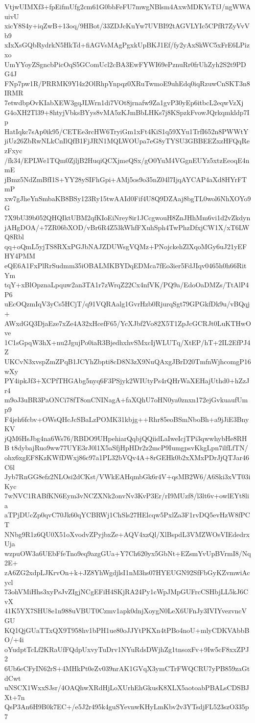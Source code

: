 VtjwUIMXf3+fpEifmUfg2cm61G0bbFeFU7mwgNBlsm4AxwMDKYsTfJ/ngWWAuivU
xicY8S4y+iqZwB+13oq/9HBot/33ZDJcKuYw7UVBI92tAGVLYIc5CPfR7ZyVvVb9
xIxXsGQbRydrkN5HkTd+fiAGVsMAgPgxkUpBKJ1Ef/fy2yAxSkWC5xFrE6LPizxo
UmYYoyZSgncbPicOqS5GComUcl2cBA3EwFYWI69ePznuRr0frUhZyh2S2t9PDG4J
FNp7pw1R/PRRMK9Yl4z2OlRhpYnpqz0XRuTwmoE9uhEdq0iqRzuwCnSKT3n8IRMR
7etwdbpOvKIabXEW3gqJLWrn1di7VOt8jrnafw9Za1gvP30yEp6itbcL2eqwVzXj
G4oXH2Tl39+8htyjVbksBYys8vMA5zKJmBbLHKs7j8KSpzkFvowJQrkqmkldp7Ip
HatIqkc7sAp0ik95/CETEe3rcHW6TryiGm1xFt4KiS1q59XYu1TrfI652n8PWWtY
jiUz26ZbRwNLkCnIlQfB1FjJRN1MQLWOUpa7eG8yTYSU3GBBEEZxzHFQqRezFxyc
/fk34/EPLWe1TQm0ZjljB2HuqiQCXjmeQSx/gO0YuM4VGgnEUYz5xtzEeoqE4nmE
jBmz5NdZmBfI1S+YY28ySIFhGpi+AMj5os9o35nZ04l7IjqAYCAP4aXd8HYrFTmP
xw7gJheYnSmbaKB8BSy123Ry15twAAId0Fif4U8Q9DZAaj8bgTL0wol6NhXOYo9G
7X9bU39b052QHQIktUBM2qfKIoEiNrey8ir1JCcgwouH8ZnJHhMm6vi1d2vZkdyn
jAHgDOA/+7ZR06bXOD/vBr6R4Z53kWhfFXuhSph4TwPhzDfxjCW1X/xT6LWQ8Rbl
qq+oQmL5yjTS8RXxPGJbNAJZDUWsgVQMz+PNojckehZlXqoMGy6uJ21yEFHY4PMM
eQE6A1FxPlRrSudmm35iOBALMKBYDqEDMca7fEo3ier5FdJIqv0465h0h66RitYm
tqY+xBlOpznaLpquw2an3TA1r7zWrqZ22Cx4nfVK/PQ9a/EdoOaDMZs/TtAlP4P6
uEcOQzmIqV3yCs5HCjT/q91VQRAalg1GvrHzb0RjurqSgt79GPGkfDk9u/vBQqj+
AWxdGQ3DjaEze7xZe4A32xHcefF65/YcXJbf2Vo82X5T1ZpJcGCRJt0LuKTHwOve
1C1sGpqW3hX+nu2JgujPo0iaR3BjedhxhvSMxcIjWLUTq/XtEP/hT+2IL2EfPJ4Z
UKCvN3xvspZmZPqB1JCYhZbpti8cD8N3zX9NuQAxgJBrD20TmfnWjhcomgP16wXy
PY4ipkJf3+XCPfTHGAbg5nyq6F3PSjyk2WIUtyPs4rQHrWaXEHajUthd0+hZzJr4
m9oJ3uBR3PaONCi78fT8onCNINagA+faXQhU7oHN0ya0znxn172ejGvkuaufUmp9
F4jeh6fcbv+OWsQHcJcSBaLzPOMK31kbjg++Rhr85eoBSmNboBh+a9jJiE3BnyKV
jQM6HsJbg4na6Ws76/RBDO9UHpehiarQqbjQQiidLaIweIcjTPi3qwwhybHe8RHB
t8dybajRuo9ww77UYE3rJ0l1X5aSfjHpHDr2z2mcP9IumgpsvKkgLpn7ilfLfTN/
ohx6xgEF8KzKWfDWxj86c97a1PL32bVQv4A+8rGEHk0b2xXMxPDrJjQTJar46C6l
Jyb7RnGG8efz2NLOsi2dCKst/VWkEAHqmbGk6r4V+qsMB2W6/A6Ski3xVT03iKyc
7wNVC1RABfKN6Eym3vNCZXNk2onvNv3KvP3Er/rI9MUzf8/l3lt6v+owlEYt8lia
aTPjDUcZp0qvC70Jk60qYCBRWj1ChSls27HElcqw5PxlZa3F1rvDQ5evHzW8fPCT
NNbg9R1z6QU0X51oXvodvZPyjbxZe+AQV4xzQl/XlBspdL3VMZWOsVIEdedrxUja
wzpuOW3a6UEbFfeTno9eq9azgGUa+Y7Ch620yx5GbNt+EZsmYvUpBVrmI8/Nq2E+
zA6ZG2xdpLJKrvOn+k+JZ8YhWgdjlsI1nM3hs07HYEUGN92SfFbGyKZvmwiAcycl
73ohVMiHhs3xyPsJvZIgjNCgEFiH4SKjRA24Py1cWpJMpGUFrcCSHbjLL5kJ6CvX
41K5YX7SHU8e1n988uVBUT0Czmv1apk0dnjXoygN0LeX6UFnJy3IVIYvezvncVGU
KQ1QjGUaTTxQX9T958hv1bPH1ue80oJJYtPKXn4tPBo4noU+mlyCDKVAbbBO/+4i
oYudptTcLf2KRaUfFQdpUxvyTuDrv1NYuRdsDWjhZg1tnsoxFv+9Iw5cF8xxZPJ2
6Ub6eCFyIN62rS+4MHkPt0eZv039nrAK1GVqX3ymCTrFWQCRU7yPB859zaGtdCwt
uNSCX1WxxSJsr/4OAQhwXRdHjLoXUrhEhGkusK8XLX5aotoabPBALsCDSBJXt+7n
QsP3An6H9B0k7EC+/e5J2r495k4guSYevnwKHyLmKbv2v3YTsdjFL523szO335p7

